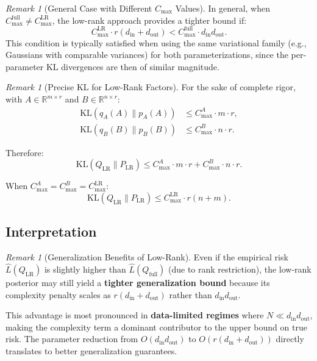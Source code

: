 \documentclass{article}
\theoremstyle{plain}
\theoremstyle{definition}
\theoremstyle{remark}
\newtheorem{remark}[theorem]{Remark}
\begin{document}
\begin{remark}[General Case with Different $C_{\max}$ Values]
In general, when $C_{\max}^{\text{full}} \neq C_{\max}^{\text{LR}}$, the low-rank approach provides a tighter bound if:
\[
C_{\max}^{\text{LR}} \cdot r(d_{\text{in}} + d_{\text{out}}) < C_{\max}^{\text{full}} \cdot d_{\text{in}}d_{\text{out}}.
\]
This condition is typically satisfied when using the same variational family (e.g., Gaussians with comparable variances) for both parameterizations, since the per-parameter KL divergences are then of similar magnitude.
\end{remark}

\begin{remark}[Precise KL for Low-Rank Factors]
For the sake of complete rigor, with $A \in \mathbb{R}^{m\times r}$ and $B \in \mathbb{R}^{n\times r}$:
\begin{align}
    \mathrm{KL}(q_A(A) \| p_A(A)) &\leq C_{\max}^A \cdot m \cdot r, \\
    \mathrm{KL}(q_B(B) \| p_B(B)) &\leq C_{\max}^B \cdot n \cdot r.
\end{align}

Therefore:
\begin{equation}
    \mathrm{KL}(Q_{\text{LR}} \| P_{\text{LR}}) \leq  C_{\max}^A \cdot m \cdot r + C_{\max}^B \cdot n \cdot r.
\end{equation}

When $C_{\max}^A = C_{\max}^B = C_{\max}^{\text{LR}}$:
\begin{equation}
    \mathrm{KL}(Q_{\text{LR}} \| P_{\text{LR}}) \leq C_{\max}^{\text{LR}} \cdot r (n + m).
\end{equation}
\end{remark}

\subsection{Interpretation}\label{app:pacbayes:interpretation}

\begin{remark}[Generalization Benefits of Low-Rank]
Even if the empirical risk $\hat{L}(Q_{\text{LR}})$ is slightly higher than $\hat{L}(Q_{\text{full}})$ (due to rank restriction), the low-rank posterior may still yield a \textbf{tighter generalization bound} because its complexity penalty scales as $r(d_{\text{in}} + d_{\text{out}})$ rather than $d_{\text{in}}d_{\text{out}}$.

This advantage is most pronounced in \textbf{data-limited regimes} where $N \ll d_{\text{in}}d_{\text{out}}$, making the complexity term a dominant contributor to the upper bound on true risk. The parameter reduction from $O(d_{\text{in}}d_{\text{out}})$ to $O(r(d_{\text{in}} + d_{\text{out}}))$ directly translates to better generalization guarantees.
\end{remark}
\end{document}
